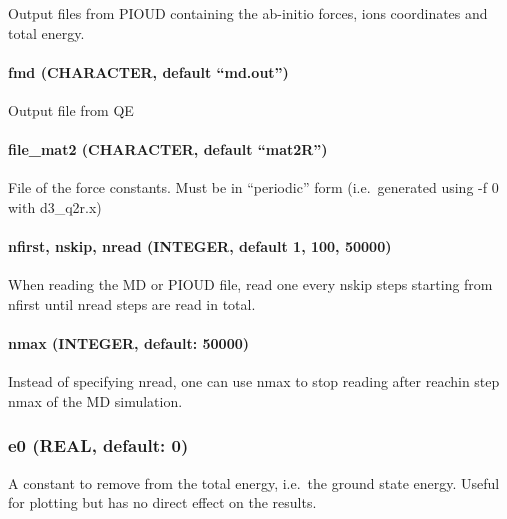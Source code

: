 \documentclass[
]{article}
\begin{document}
Output files from PIOUD containing the ab-initio forces, ions
coordinates and total energy.

\hypertarget{fmd-character-default-md.out}{%
\paragraph{\texorpdfstring{fmd (CHARACTER, default
\enquote{md.out})}{fmd (CHARACTER, default ``md.out'')}}\label{fmd-character-default-md.out}}

Output file from QE

\hypertarget{file_mat2-character-default-mat2r}{%
\paragraph{\texorpdfstring{file\_mat2 (CHARACTER, default
\enquote{mat2R})}{file\_mat2 (CHARACTER, default ``mat2R'')}}\label{file_mat2-character-default-mat2r}}

File of the force constants. Must be in \enquote{periodic} form
(i.e.~generated using -f 0 with d3\_q2r.x)

\hypertarget{nfirst-nskip-nread-integer-default-1-100-50000}{%
\paragraph{nfirst, nskip, nread (INTEGER, default 1, 100,
50000)}\label{nfirst-nskip-nread-integer-default-1-100-50000}}

When reading the MD or PIOUD file, read one every nskip steps starting
from nfirst until nread steps are read in total.

\hypertarget{nmax-integer-default-50000}{%
\paragraph{nmax (INTEGER, default:
50000)}\label{nmax-integer-default-50000}}

Instead of specifying nread, one can use nmax to stop reading after
reachin step nmax of the MD simulation.

\hypertarget{e0-real-default-0}{%
\subsubsection{e0 (REAL, default: 0)}\label{e0-real-default-0}}

A constant to remove from the total energy, i.e.~the ground state
energy. Useful for plotting but has no direct effect on the results.
\end{document}
